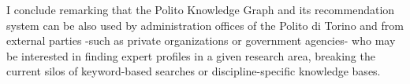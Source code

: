 \documentclass[english, 12pt]{article}
\begin{document}
I conclude remarking that the Polito Knowledge Graph and its recommendation
system can be also used by administration offices of the Polito di Torino and
from external parties -such as private organizations or government agencies- who
may be interested in finding expert profiles in a given research area, breaking
the current silos of keyword-based searches or discipline-specific
knowledge bases.
\end{document}
